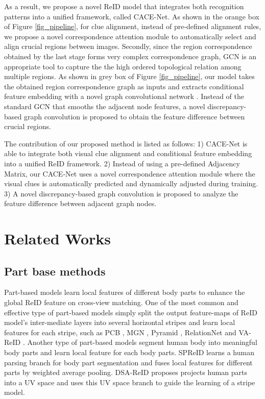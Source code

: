 \documentclass[final]{cvpr}
\begin{document}
As a result, we propose a novel ReID model that integrates both recognition patterns into a unified framework, called CACE-Net. 
As shown in the orange box of Figure \ref{fig_pipeline}, for clue alignment, instead of pre-defined alignment rules, we propose a novel correspondence attention module to automatically select and align crucial regions between images. 
Secondly, since the region correspondence obtained by the last stage forms very complex correspondence graph, GCN is an appropriate tool to capture the the high ordered topological relation among multiple regions. As shown in grey box of Figure \ref{fig_pipeline}, our model takes the obtained region correspondence graph as inputs and extracts conditional feature embedding with a novel graph convolutional network \cite{kipf2016semi,bruna2013spectral}. 
Instead of the standard GCN that smooths the adjacent node features, a novel discrepancy-based graph convolution is proposed to obtain the feature difference between crucial regions. 




The contribution of our proposed method is listed as follows:
1) CACE-Net is able to integrate both visual clue alignment and conditional feature embedding into a unified ReID framework.  2) Instead of using a pre-defined Adjacency Matrix, our CACE-Net uses a novel correspondence attention module where the visual clues is automatically predicted and dynamically adjusted during training. 
3) A novel discrepancy-based graph convolution is proposed to analyze the feature difference between adjacent graph nodes. 


\section{Related Works}
\subsection{Part base methods}
Part-based models learn local features of different body parts to enhance the global ReID feature on cross-view matching. One of the most common and effective type of part-based models simply split the output feature-maps of ReID model's inter-mediate layers into several horizontal stripes and learn local features for each stripe, such as PCB \cite{Sun_2018_ECCV}, MGN \cite{wang2018learning}, Pyramid  \cite{Zheng_2019_CVPR}, RelationNet \cite{park2020relation} and VA-ReID \cite{zhu2019aware}. Another type of part-based models \cite{li2017learning, zhao2017spindle, zheng2019pose}segment human body into meaningful body parts and learn local feature for each body parts. SPReID \cite{Kalayeh_2018_CVPR} learns a human parsing branch for body part segmentation and fuses local features for different parts by weighted average pooling. DSA-ReID \cite{Zhang_2019_CVPR} proposes projects human parts into a UV space and uses this UV space branch to guide the learning of a stripe model. 
\end{document}
